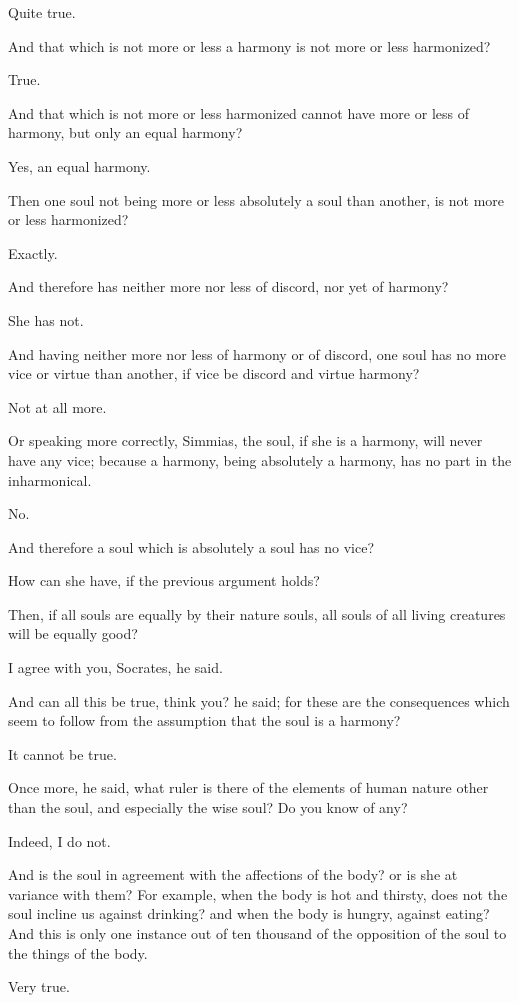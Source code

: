Quite true.

And that which is not more or less a harmony is not more or less
harmonized?

True.

And that which is not more or less harmonized cannot have more or less
of harmony, but only an equal harmony?

Yes, an equal harmony.

Then one soul not being more or less absolutely a soul than another, is
not more or less harmonized?

Exactly.

And therefore has neither more nor less of discord, nor yet of harmony?

She has not.

And having neither more nor less of harmony or of discord, one soul
has no more vice or virtue than another, if vice be discord and virtue
harmony?

Not at all more.

Or speaking more correctly, Simmias, the soul, if she is a harmony, will
never have any vice; because a harmony, being absolutely a harmony, has
no part in the inharmonical.

No.

And therefore a soul which is absolutely a soul has no vice?

How can she have, if the previous argument holds?

Then, if all souls are equally by their nature souls, all souls of all
living creatures will be equally good?

I agree with you, Socrates, he said.

And can all this be true, think you? he said; for these are the
consequences which seem to follow from the assumption that the soul is a
harmony?

It cannot be true.

Once more, he said, what ruler is there of the elements of human nature
other than the soul, and especially the wise soul? Do you know of any?

Indeed, I do not.

And is the soul in agreement with the affections of the body? or is she
at variance with them? For example, when the body is hot and thirsty,
does not the soul incline us against drinking? and when the body
is hungry, against eating? And this is only one instance out of ten
thousand of the opposition of the soul to the things of the body.

Very true.

